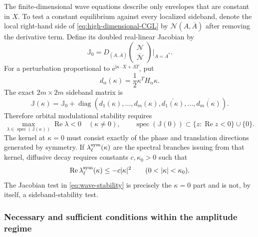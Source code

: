\documentclass[11pt]{article}
\newcommand{\ii}{\mathrm{i}}
\newcommand{\ee}{\mathrm{e}}
\newcommand{\RePart}{\operatorname{Re}}
\begin{document}
The finite-dimensional wave equations describe only envelopes that are
constant in $X$.  To test a constant equilibrium against every localized
sideband, denote the local right-hand side of
\eqref{eq:high-dimensional-CGL} by $\mathcal N(A,\overline A)$ after removing
the derivative term.  Define its doubled real-linear Jacobian by
\begin{equation}
 \mathbb J_0=
 D_{(A,\overline A)}
 \begin{pmatrix}\mathcal N\\ \overline{\mathcal N}\end{pmatrix}
 \bigg|_{A=A^*}.
 \label{eq:sideband-J0}
\end{equation}
For a perturbation proportional to
$\ee^{\ii\kappa\cdot X+\Lambda T}$, put
\begin{equation}
 d_\alpha(\kappa)=\frac12\kappa^TH_\alpha\kappa.
 \label{eq:sideband-symbol}
\end{equation}
The exact $2m\times2m$ sideband matrix is
\begin{equation}
 \mathbb J(\kappa)=\mathbb J_0+
 \operatorname{diag}\!\left(
 d_1(\kappa),\ldots,d_m(\kappa),
 \overline{d_1(\kappa)},\ldots,
 \overline{d_m(\kappa)}\right).
 \label{eq:sideband-J}
\end{equation}
Therefore orbital modulational stability requires
\begin{equation}
 \max_{\lambda\in\operatorname{spec}(\mathbb J(\kappa))}
 \RePart\lambda<0
 \quad(\kappa\ne0),
 \qquad
 \operatorname{spec}(\mathbb J(0))
 \subset\{z:\RePart z<0\}\cup\{0\}.
 \label{eq:sideband-stability}
\end{equation}
The kernel at $\kappa=0$ must consist exactly of the phase and translation
directions generated by symmetry.  If
$\lambda^{\rm sym}_\ell(\kappa)$ are the spectral branches issuing from
that kernel, diffusive decay requires constants $c,\kappa_0>0$ such that
\begin{equation}
 \RePart\lambda^{\rm sym}_\ell(\kappa)
 \leq-c|\kappa|^2
 \qquad(0<|\kappa|<\kappa_0).
 \label{eq:sideband-diffusive-decay}
\end{equation}
The Jacobian test in
\eqref{eq:wave-stability} is precisely the $\kappa=0$ part and is not, by
itself, a sideband-stability test.

\subsubsection{Necessary and sufficient conditions within the amplitude regime}
\end{document}
